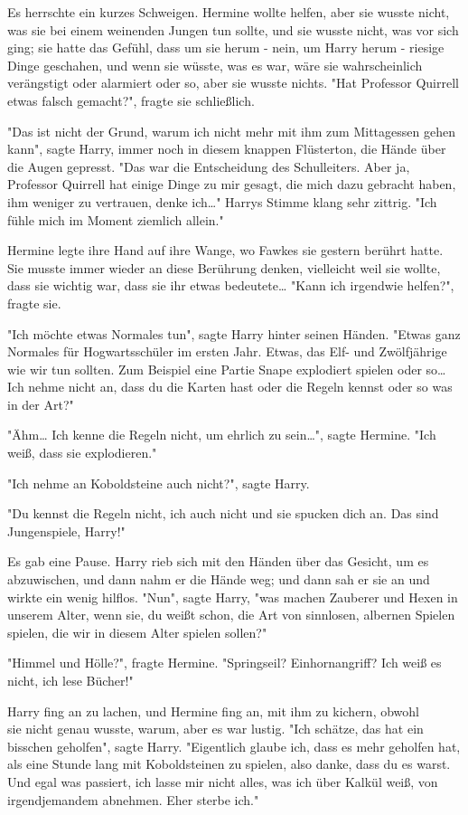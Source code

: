 {Es herrschte ein kurzes Schweigen. Hermine wollte helfen, aber sie wusste nicht, was sie bei einem weinenden Jungen tun sollte, und sie wusste nicht, was vor sich ging; sie hatte das Gefühl, dass um sie herum - nein, um Harry herum - riesige Dinge geschahen, und wenn sie wüsste, was es war, wäre sie wahrscheinlich verängstigt oder alarmiert oder so, aber sie wusste nichts. "Hat Professor Quirrell etwas falsch gemacht?", fragte sie schließlich.

"Das ist nicht der Grund, warum ich nicht mehr mit ihm zum Mittagessen gehen kann", sagte Harry, immer noch in diesem knappen Flüsterton, die Hände über die Augen gepresst. "Das war die Entscheidung des Schulleiters. Aber ja, Professor Quirrell hat einige Dinge zu mir gesagt, die mich dazu gebracht haben, ihm weniger zu vertrauen, denke ich…" Harrys Stimme klang sehr zittrig. "Ich fühle mich im Moment ziemlich allein."

Hermine legte ihre Hand auf ihre Wange, wo Fawkes sie gestern berührt hatte. Sie musste immer wieder an diese Berührung denken, vielleicht weil sie wollte, dass sie wichtig war, dass sie ihr etwas bedeutete… "Kann ich irgendwie helfen?", fragte sie.

"Ich möchte etwas Normales tun", sagte Harry hinter seinen Händen. "Etwas ganz Normales für Hogwartsschüler im ersten Jahr. Etwas, das Elf- und Zwölfjährige wie wir tun sollten. Zum Beispiel eine Partie Snape explodiert spielen oder so… Ich nehme nicht an, dass du die Karten hast oder die Regeln kennst oder so was in der Art?"

"Ähm… Ich kenne die Regeln nicht, um ehrlich zu sein…", sagte Hermine. "Ich weiß, dass sie explodieren."

"Ich nehme an Koboldsteine auch nicht?", sagte Harry.

"Du kennst die Regeln nicht, ich auch nicht und sie spucken dich an. Das sind Jungenspiele, Harry!"

Es gab eine Pause. Harry rieb sich mit den Händen über das Gesicht, um es abzuwischen, und dann nahm er die Hände weg; und dann sah er sie an und wirkte ein wenig hilflos. "Nun", sagte Harry, "was machen Zauberer und Hexen in unserem Alter, wenn sie, du weißt schon, die Art von sinnlosen, albernen Spielen spielen, die wir in diesem Alter spielen sollen?"

"Himmel und Hölle?", fragte Hermine. "Springseil? Einhornangriff? Ich weiß es nicht, ich lese Bücher!"

Harry fing an zu lachen, und Hermine fing an, mit ihm zu kichern, obwohl\\ sie nicht genau wusste, warum, aber es war lustig. "Ich schätze, das hat ein bisschen geholfen", sagte Harry. "Eigentlich glaube ich, dass es mehr geholfen hat, als eine Stunde lang mit Koboldsteinen zu spielen, also danke, dass du es warst. Und egal was passiert, ich lasse mir nicht alles, was ich über Kalkül weiß, von irgendjemandem abnehmen. Eher sterbe ich."

}
